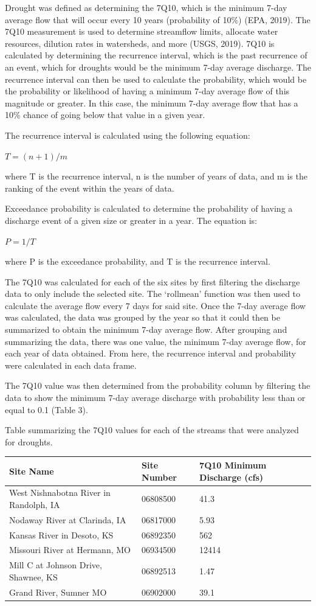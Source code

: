 \documentclass[12pt,]{article}
\begin{document}
Drought was defined as determining the 7Q10, which is the minimum 7-day
average flow that will occur every 10 years (probability of 10\%) (EPA,
2019). The 7Q10 measurement is used to determine streamflow limits,
allocate water resources, dilution rates in watersheds, and more (USGS,
2019). 7Q10 is calculated by determining the recurrence interval, which
is the past recurrence of an event, which for droughts would be the
minimum 7-day average discharge. The recurrence interval can then be
used to calculate the probability, which would be the probability or
likelihood of having a minimum 7-day average flow of this magnitude or
greater. In this case, the minimum 7-day average flow that has a 10\%
chance of going below that value in a given year.

The recurrence interval is calculated using the following equation:

\(T = (n+1)/m\)

where T is the recurrence interval, n is the number of years of data,
and m is the ranking of the event within the years of data.

Exceedance probability is calculated to determine the probability of
having a discharge event of a given size or greater in a year. The
equation is:

\(P = 1/T\)

where P is the exceedance probability, and T is the recurrence interval.

The 7Q10 was calculated for each of the six sites by first filtering the
discharge data to only include the selected site. The `rollmean'
function was then used to calculate the average flow every 7 days for
said site. Once the 7-day average flow was calculated, the data was
grouped by the year so that it could then be summarized to obtain the
minimum 7-day average flow. After grouping and summarizing the data,
there was one value, the minimum 7-day average flow, for each year of
data obtained. From here, the recurrence interval and probability were
calculated in each data frame.

The 7Q10 value was then determined from the probability column by
filtering the data to show the minimum 7-day average discharge with
probability less than or equal to 0.1 (Table 3).

Table summarizing the 7Q10 values for each of the streams that were
analyzed for droughts.

\begin{longtable}[]{@{}lll@{}}
\toprule
Site Name & Site Number & 7Q10 Minimum Discharge (cfs)\tabularnewline
\midrule
\endhead
West Nishnabotna River in Randolph, IA & 06808500 & 41.3\tabularnewline
Nodaway River at Clarinda, IA & 06817000 & 5.93\tabularnewline
Kansas River in Desoto, KS & 06892350 & 562\tabularnewline
Missouri River at Hermann, MO & 06934500 & 12414\tabularnewline
Mill C at Johnson Drive, Shawnee, KS & 06892513 & 1.47\tabularnewline
Grand River, Sumner MO & 06902000 & 39.1\tabularnewline
\bottomrule
\end{longtable}
\end{document}
